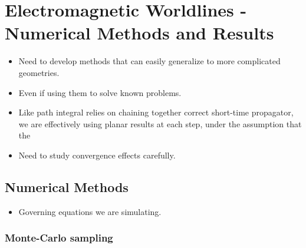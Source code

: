 \chapter{Electromagnetic Worldlines - Numerical Methods and Results}

\begin{itemize}
\item Need to develop methods that can easily generalize to more complicated geometries.
\item Even if using them to solve known problems.
\item Like path integral relies on chaining together correct short-time propagator, we 
  are effectively using planar results at each step, under the assumption that the 
\item Need to study convergence effects carefully.  

\end{itemize}


\section{Numerical Methods}

\begin{itemize}
  \item Governing equations we are simulating.  
\end{itemize}


\subsection{Monte-Carlo sampling}

